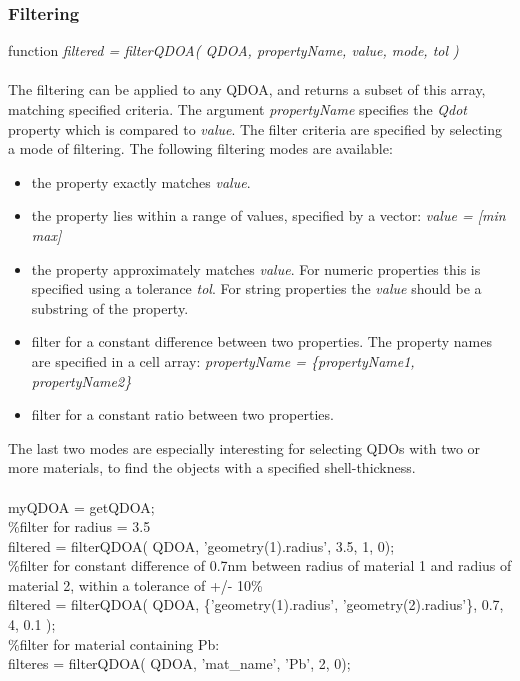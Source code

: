 \subsubsection{Filtering}
function \textit{filtered = filterQDOA( QDOA, propertyName, value, mode, tol )}\\\\
The filtering can be applied to any QDOA, and returns a subset of this array, matching specified criteria. The argument \textit{propertyName} specifies the \textit{Qdot} property which is compared to \textit{value}. The filter criteria are specified by selecting a mode of filtering. 
The following filtering modes are available:\\
\begin{itemize}
\item the property exactly matches \textit{value}.
\item the property lies within a range of values, specified by a vector: \textit{value = [min max]}
\item the property approximately matches \textit{value}. For numeric properties this is specified using a tolerance \textit{tol}. For string properties the \textit{value} should be a substring of the property.
\item filter for a constant difference between two properties. The property names are specified in a cell array: \textit{propertyName = \{propertyName1, propertyName2\}}
\item filter for a constant ratio between two properties.
\end{itemize}
The last two modes are especially interesting for selecting QDOs with two or more materials, to find the objects with a specified shell-thickness.\\
\\
myQDOA = getQDOA;\\
\%filter for radius = 3.5 \\
filtered = filterQDOA( QDOA, 'geometry(1).radius',  3.5, 1, 0);\\
\%filter for constant difference of 0.7nm between radius of material 1 and radius of material 2, within a tolerance of +/- 10\%\\
filtered = filterQDOA( QDOA, \{'geometry(1).radius', 'geometry(2).radius'\}, 0.7, 4, 0.1 );\\
\%filter for material containing Pb:\\
filteres = filterQDOA( QDOA, 'mat\_name', 'Pb', 2, 0);\\

